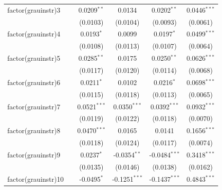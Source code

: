 \begin{tabular}{lccccc}
   factor(grauinstr)3       &                & 0.0209$^{**}$           & 0.0134                  & 0.0202$^{**}$           & 0.0446$^{***}$\\   
                            &                & (0.0103)                & (0.0104)                & (0.0093)                & (0.0061)\\   
   factor(grauinstr)4       &                & 0.0193$^{*}$            & 0.0099                  & 0.0197$^{*}$            & 0.0499$^{***}$\\   
                            &                & (0.0108)                & (0.0113)                & (0.0107)                & (0.0064)\\   
   factor(grauinstr)5       &                & 0.0285$^{**}$           & 0.0175                  & 0.0250$^{**}$           & 0.0626$^{***}$\\   
                            &                & (0.0117)                & (0.0120)                & (0.0114)                & (0.0068)\\   
   factor(grauinstr)6       &                & 0.0211$^{*}$            & 0.0102                  & 0.0216$^{*}$            & 0.0698$^{***}$\\   
                            &                & (0.0115)                & (0.0118)                & (0.0113)                & (0.0065)\\   
   factor(grauinstr)7       &                & 0.0521$^{***}$          & 0.0350$^{***}$          & 0.0392$^{***}$          & 0.0932$^{***}$\\   
                            &                & (0.0119)                & (0.0122)                & (0.0118)                & (0.0070)\\   
   factor(grauinstr)8       &                & 0.0470$^{***}$          & 0.0165                  & 0.0141                  & 0.1656$^{***}$\\   
                            &                & (0.0118)                & (0.0124)                & (0.0117)                & (0.0074)\\   
   factor(grauinstr)9       &                & 0.0237$^{*}$            & -0.0354$^{**}$          & -0.0484$^{***}$         & 0.3418$^{***}$\\   
                            &                & (0.0135)                & (0.0146)                & (0.0138)                & (0.0162)\\   
   factor(grauinstr)10      &                & -0.0495$^{*}$           & -0.1251$^{***}$         & -0.1437$^{***}$         & 0.4843$^{***}$\\   

\end{tabular}
